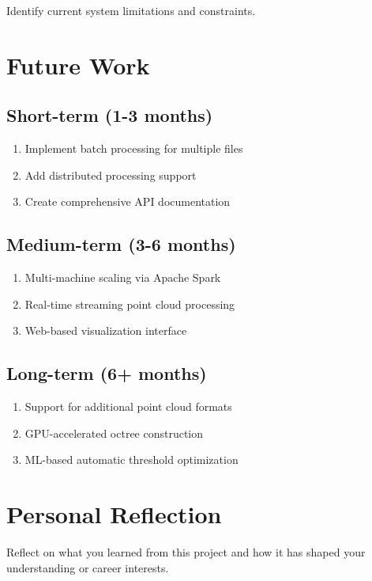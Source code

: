 \documentclass[12pt,a4paper,onecolumn,oneside]{report}
\begin{document}
Identify current system limitations and constraints.

\section{Future Work}
\label{sec:conclusion:future}

\subsection{Short-term (1-3 months)}

\begin{enumerate}
    \item Implement batch processing for multiple files
    \item Add distributed processing support
    \item Create comprehensive API documentation
\end{enumerate}

\subsection{Medium-term (3-6 months)}

\begin{enumerate}
    \item Multi-machine scaling via Apache Spark
    \item Real-time streaming point cloud processing
    \item Web-based visualization interface
\end{enumerate}

\subsection{Long-term (6+ months)}

\begin{enumerate}
    \item Support for additional point cloud formats
    \item GPU-accelerated octree construction
    \item ML-based automatic threshold optimization
\end{enumerate}

\section{Personal Reflection}
\label{sec:conclusion:reflection}

Reflect on what you learned from this project and how it has shaped your understanding or career interests.
\end{document}
